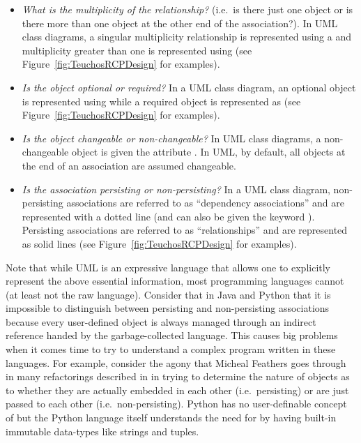 \documentclass[pdf,ps2pdf,11pt]{SANDreport}
\begin{document}
\begin{itemize}

{}\item\textit{What is the multiplicity of the relationship?}  (i.e.\
is there just one object or is there more than one object at the other
end of the association?).  In UML class diagrams, a singular
multiplicity relationship is represented using a {} and
multiplicity greater than one is represented using {} (see
Figure~\ref{fig:TeuchosRCPDesign} for examples).

{}\item\textit{Is the object optional or required?}  In a UML class
diagram, an optional object is represented using {}\ttt{0..1} while a
required object is represented as {}\ttt{1} (see
Figure~\ref{fig:TeuchosRCPDesign} for examples).

{}\item\textit{Is the object changeable or non-changeable?}  In UML
class diagrams, a non-changeable object is given the attribute
{}.  In UML, by default, all objects at the end of
an association are assumed changeable.

{}\item\textit{Is the association persisting or non-persisting?}  In a
UML class diagram, non-persisting associations are referred to as
``dependency associations'' and are represented with a dotted line
(and can also be given the keyword {}\ttt{$\ll$parameter$\gg$}).
Persisting associations are referred to as ``relationships'' and are
represented as solid lines (see Figure~\ref{fig:TeuchosRCPDesign} for
examples).

\end{itemize}

Note that while UML is an expressive language that allows one to
explicitly represent the above essential information, most programming
languages cannot (at least not the raw language).  Consider that in
Java and Python that it is impossible to distinguish between
persisting and non-persisting associations because every user-defined
object is always managed through an indirect reference handed by the
garbage-collected language.  This causes big problems when it comes
time to try to understand a complex program written in these
languages.  For example, consider the agony that Micheal Feathers goes
through in many refactorings described in
{}\cite{WorkingEffectivelyWithLegacyCode05} in trying to determine the
nature of objects as to whether they are actually embedded in each
other (i.e.\ persisting) or are just passed to each other (i.e.\
non-persisting).  Python has no user-definable concept of
{} but the Python language itself understands the need for
{}\ttt{const} by having built-in immutable data-types like strings and
tuples.
\end{document}
